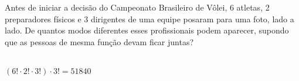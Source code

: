 \begin{ex}
Antes de iniciar a decisão do Campeonato Brasileiro de Vôlei, 6 atletas, 2 preparadores físicos  e 3 dirigentes de uma equipe posaram para uma foto, lado a lado. De quantos modos diferentes esses profissionais podem aparecer, supondo que as pessoas de mesma função devam ficar juntas?
  \begin{sol}
    \phantom{A} \\
    $(6!\cdot2!\cdot3!)\cdot3!=51840$
  \end{sol}
\end{ex}